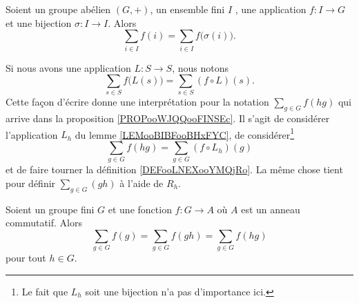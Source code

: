 \begin{proposition}     \label{PROPooJBQVooNqWErk}
    Soient un groupe abélien \( (G,+)\), un ensemble fini \( I\) , une application \( f\colon I\to G\) et une bijection \( \sigma\colon I\to I\). Alors
    \begin{equation}
        \sum_{i\in I}f(i)=\sum_{i\in I}f\big( \sigma(i) \big).
    \end{equation}
\end{proposition}

Si nous avons une application \( L\colon S\to S\), nous notons
\begin{equation}
    \sum_{s\in S}f\big( L(s) \big)=\sum_{s\in S}(f\circ L)(s).
\end{equation}
Cette façon d'écrire donne une interprétation pour la notation \( \sum_{g\in G}f(hg)\) qui arrive dans la proposition \ref{PROPooWJQQooFINSEc}. Il s'agit de considérer l'application \( L_h\) du lemme \ref{LEMooBIBFooBHxFYC}, de considérer\footnote{Le fait que \( L_h\) soit une bijection n'a pas d'importance ici.}
\begin{equation}        \label{EQooQQBEooFDOBVG}
    \sum_{g\in G}f(hg)=\sum_{g\in G}(f\circ L_h)(g)
\end{equation}
et de faire tourner la définition \ref{DEFooLNEXooYMQjRo}. La même chose tient pour définir \( \sum_{g\in G}(gh)\) à l'aide de \( R_h\).

\begin{proposition}     \label{PROPooWJQQooFINSEc}
    Soient un groupe fini \( G\) et une fonction \( f\colon G\to A\) où \( A\) est un anneau commutatif. Alors
    \begin{equation}
        \sum_{g\in G}f(g)=\sum_{g\in G}f(gh)=\sum_{g\in G}f(hg)
    \end{equation}
    pour tout \( h\in G\).
\end{proposition}

